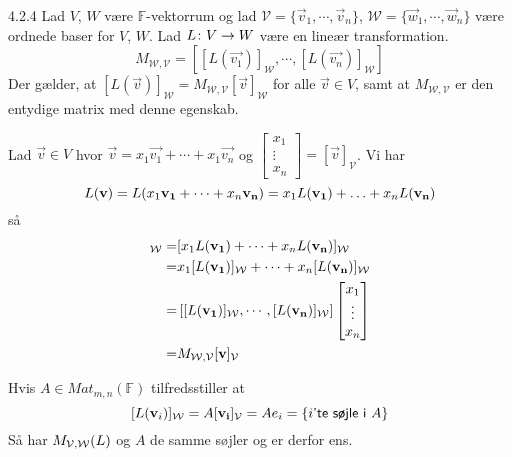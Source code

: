 %
% 

\begin{saetning}{4.2.4}
	Lad $V$, $W$ være $\mathbb{F}$-vektorrum og lad $\mathcal{V}=\{\vec{v}_1,
	\cdots,\vec{v}_n\}$, $\mathcal{W}=\{\vec{w}_1,\cdots,\vec{w}_n\}$ være
	ordnede baser for $V$, $W$. Lad $L \colon V \rightarrow W$ være en lineær transformation.
	\[
		M_{\mathcal{W},\mathcal{V}} = [[L(\vec{v_1})]_\mathcal{W}, \cdots,
		[L(\vec{v_n})]_\mathcal{W}]
	\]
	Der gælder, at $[L(\vec{v})]_\mathcal{W} = M_{\mathcal{W},\mathcal{V}}
	[\vec{v}]_\mathcal{W}$ for alle $\vec{v} \in V$, samt at
	$M_{\mathcal{W},\mathcal{V}}$ er den entydige matrix med denne egenskab.
\end{saetning}

\begin{bevis}
	Lad $\vec{v} \in V$ hvor $\vec{v} = x_1 \vec{v_1} + \cdots + x_1 \vec{v_n}$
	og $\begin{bmatrix} x_1 \\ \vdots \\ x_n \end{bmatrix} =
	[\vec{v}]_\mathcal{V}$. Vi har
	\[
		L(\mathbf{v}) = L(x_1 \mathbf{v_1} + \cdots + x_n \mathbf{v_n}) = x_1L(\mathbf{v_1}) + 
		\dotsc + x_nL(\mathbf{v_n})
	\]
	så
	\begin{align*}
		[L(\vv)]_\sW =& [x_1 L(\vec{v_1}) + \cdots + x_n L(\vec{v_n})]_\sW \\
			=& x_1 [L(\vec{v_1})]_\sW + \cdots + x_n [L(\vec{v_n})]_\sW \\
			=& \left[ [L(\vec{v_1})]_\sW, \cdots, [L(\vec{v_n})]_\sW
				\right] \begin{bmatrix}
					x_1 \\
					\vdots \\
					x_n
				\end{bmatrix} \\
			=& M_{\sW,\sV} [\vv]_\sV
	\end{align*}

	Hvis $A \in Mat_{m,n}(\mathbb{F})$ tilfredsstiller at
	\[
		[L(\mathbf{v}_i)]_{\mathcal{W}} = A[\mathbf{v_i}]_{\mathcal{V}} = Ae_i = \{i \textsf{'te søjle i } A\}
	\]
	Så har $M_{\mathcal{V},\mathcal{W}}(L)$ og $A$ de samme søjler og er derfor ens.
\end{bevis}
